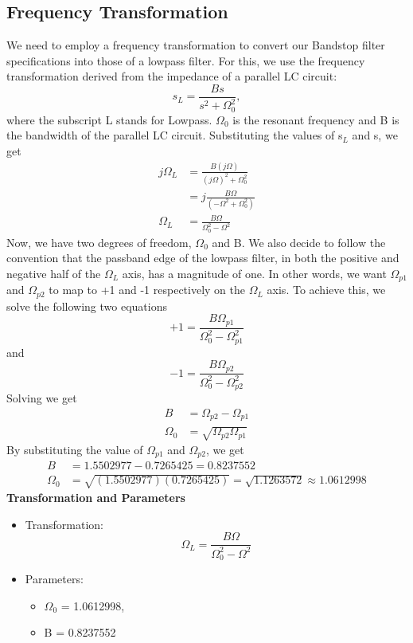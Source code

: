 \documentclass[12pt]{article}
\begin{document}
\subsection{Frequency Transformation}
We need to employ a frequency transformation to convert our Bandstop filter specifications into those of a lowpass filter. For this, we use the frequency transformation derived from the impedance of a parallel LC circuit:
\[s_L = \frac{Bs}{s^2 + \Omega_0^2},\]
where the subscript L stands for Lowpass. $\Omega_0$ is the resonant frequency and B is the bandwidth of the parallel LC circuit. Substituting the values of s$_L$ and s, we get
\begin{align*}
    j\Omega_L &= \frac{B(j\Omega)}{(j\Omega)^2 + \Omega_0^2}\\
    &= j\frac{B\Omega}{(-\Omega^2 + \Omega_0^2)}\\
    \Omega_L &= \frac{B\Omega}{\Omega_0^2 - \Omega^2}
\end{align*}
Now, we have two degrees of freedom, $\Omega_0$ and B. We also decide to follow the convention that the passband edge of the lowpass filter, in both the positive and negative half of the $\Omega_L$ axis, has a magnitude of one. In other words, we want $\Omega_{p1}$ and $\Omega_{p2}$ to map to +1 and -1 respectively on the $\Omega_L$ axis. To achieve this, we solve the following two equations
\[+1 = \frac{B\Omega_{p1}}{\Omega_0^2 - \Omega_{p1}^2}\]
and
\[-1 = \frac{B\Omega_{p2}}{\Omega_0^2 - \Omega_{p2}^2}\]
Solving we get
\begin{align*}
    B &= \Omega_{p2} - \Omega_{p1}\\
    \Omega_0 &= \sqrt{\Omega_{p2}\Omega_{p1}}
\end{align*}
By substituting the value of $\Omega_{p1}$ and $\Omega_{p2}$, we get
\begin{align*}
    B &= 1.5502977 - 0.7265425 = 0.8237552\\
    \Omega_0 &= \sqrt{(1.5502977)(0.7265425)} = \sqrt{1.1263572} \approx 1.0612998
\end{align*}
\newpage
\hline
\vspace{10pt}
\textbf{Transformation and Parameters}
\begin{itemize}
    \item Transformation:\[\Omega_L = \frac{B\Omega}{\Omega_0^2 - \Omega^2}\]
    \item Parameters:
    \begin{itemize}
        \item $\Omega_0$ = 1.0612998,
        \item B = 0.8237552
    \end{itemize}
\end{itemize}
\hline
\end{document}

